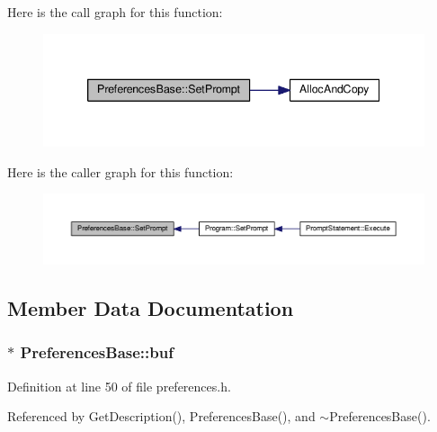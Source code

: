 Here is the call graph for this function\+:\nopagebreak
\begin{figure}[H]
\begin{center}
\leavevmode
\includegraphics[width=339pt]{classPreferencesBase_a84ef7562c15ce4921ea8821e6301d302_cgraph}
\end{center}
\end{figure}




Here is the caller graph for this function\+:\nopagebreak
\begin{figure}[H]
\begin{center}
\leavevmode
\includegraphics[width=350pt]{classPreferencesBase_a84ef7562c15ce4921ea8821e6301d302_icgraph}
\end{center}
\end{figure}




\subsection{Member Data Documentation}
\subsubsection[{\texorpdfstring{buf}{buf}}]{$\ast$ Preferences\+Base\+::buf\hspace{0.3cm}{\ttfamily [private]}}\hypertarget{classPreferencesBase_a56ccdce81b9347c99eacb1839cee0a49}{}\label{classPreferencesBase_a56ccdce81b9347c99eacb1839cee0a49}


Definition at line 50 of file preferences.\+h.



Referenced by Get\+Description(), Preferences\+Base(), and $\sim$\+Preferences\+Base().

